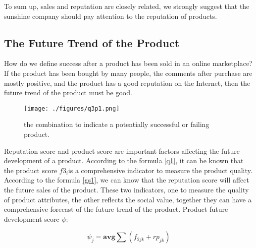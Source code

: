 \documentclass{mcmthesis}
\begin{document}
To sum up, sales and reputation are closely related, we strongly suggest that the sunshine company should pay attention to the reputation of products.

\subsection{The Future Trend of the Product }

How do we define success after a product has been sold in an online marketplace? If the product has been bought by many people, the comments after purchase are mostly positive, and the product has a good reputation on the Internet, then the future trend of the product must be good.

\begin{figure}[h]
	\centering
	\texttt{[image: ./figures/q3p1.png]}
	\caption{the combination to indicate a potentially successful or failing product.} \label{q3p11}
\end{figure}

Reputation score and product score are important factors affecting the future development of a product. According to the formula \ref{q1}, it can be known that the product score $f3_i$is a comprehensive indicator to measure the product quality. According to the formula \ref{gs1}, we can know that the reputation score will affect the future sales of the product. These two indicators, one to measure the quality of product attributes, the other reflects the social value, together they can have a comprehensive forecast of the future trend of the product. Product future development score $\psi$:

\begin{equation}\label{gs4q1}
\psi_j=\mathbf{avg}\sum (f_{2jk}+rp_{jk})
\end{equation}
\end{document}
